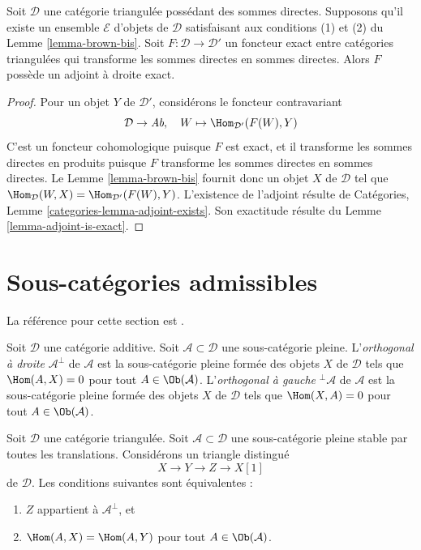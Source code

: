 \begin{proposition}
\label{proposition-brown-bis}
Soit $\mathcal{D}$ une catégorie triangulée possédant des sommes directes.
Supposons qu'il existe un ensemble $\mathcal{E}$ d'objets de $\mathcal{D}$
satisfaisant aux conditions (1) et (2) du Lemme \ref{lemma-brown-bis}.
Soit $F : \mathcal{D} \to \mathcal{D}'$ un foncteur exact entre catégories
triangulées qui transforme les sommes directes en sommes directes.
Alors $F$ possède un adjoint à droite exact.
\end{proposition}

\begin{proof}
Pour un objet $Y$ de $\mathcal{D}'$, considérons le foncteur contravariant
$$
\mathcal{D} \to \textit{Ab},\quad W \mapsto \Hom_{\mathcal{D}'}(F(W), Y)
$$
C'est un foncteur cohomologique puisque $F$ est exact, et il transforme les
sommes directes en produits puisque $F$ transforme les sommes directes en
sommes directes. Le Lemme \ref{lemma-brown-bis} fournit donc un objet $X$ de
$\mathcal{D}$ tel que
$\Hom_\mathcal{D}(W, X) = \Hom_{\mathcal{D}'}(F(W), Y)$.
L'existence de l'adjoint résulte de
Catégories, Lemme \ref{categories-lemma-adjoint-exists}.
Son exactitude résulte du Lemme \ref{lemma-adjoint-is-exact}.
\end{proof}

\section{Sous-catégories admissibles}
\label{section-admissible}

\noindent
La référence pour cette section est \cite[section 1]{Bondal-Kapranov}.

\begin{definition}
\label{definition-orthogonal}
Soit $\mathcal{D}$ une catégorie additive. Soit
$\mathcal{A} \subset \mathcal{D}$ une sous-catégorie pleine.
L'{\it orthogonal à droite} $\mathcal{A}^\perp$ de $\mathcal{A}$ est la
sous-catégorie pleine formée des objets $X$ de $\mathcal{D}$ tels que
$\Hom(A, X) = 0$ pour tout $A \in \Ob(\mathcal{A})$.
L'{\it orthogonal à gauche} ${}^\perp\mathcal{A}$ de $\mathcal{A}$ est la
sous-catégorie pleine formée des objets $X$ de $\mathcal{D}$ tels que
$\Hom(X, A) = 0$ pour tout $A \in \Ob(\mathcal{A})$.
\end{definition}

\begin{lemma}
\label{lemma-pre-prepare-adjoint}
Soit $\mathcal{D}$ une catégorie triangulée.
Soit $\mathcal{A} \subset \mathcal{D}$ une sous-catégorie pleine stable par
toutes les translations. Considérons un triangle distingué
$$
X \to Y \to Z \to X[1]
$$
de $\mathcal{D}$. Les conditions suivantes sont équivalentes :
\begin{enumerate}
\item $Z$ appartient à $\mathcal{A}^\perp$, et
\item $\Hom(A, X) = \Hom(A, Y)$ pour tout $A \in \Ob(\mathcal{A})$.
\end{enumerate}
\end{lemma}

